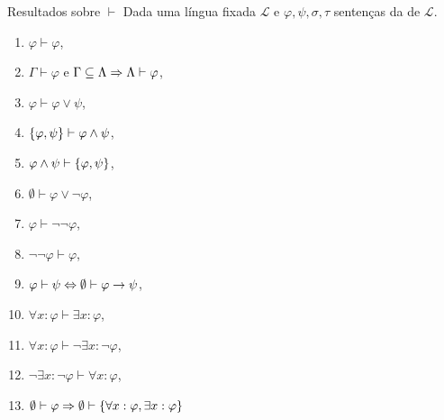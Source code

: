         \begin{proposition}{Resultados sobre $\vdash$}
            Dada uma língua fixada $\mathcal{L}$ e 
            $\varphi,\psi,\sigma,\tau$ sentenças da
            de $\mathcal{L}$.
            \label{vdash_results_00}
            \begin{enumerate}[label=\alph*)]
                \item $    {\varphi}\vdash\varphi$,
                \item $\Gamma\vdash\varphi$ e $\Gamma\subseteq\Lambda\Rightarrow \Lambda\vdash\varphi$,
                \item $    {\varphi}\vdash\varphi\lor\psi$,
                \item $\SET{\varphi}{\psi}\vdash\varphi\land\psi$,
                \item $    {\varphi\land\psi}\vdash\SET{\varphi}{\psi}$,
                \item $\emptyset\vdash  \varphi\lor\neg\varphi$,
                \item $\varphi\vdash\neg\neg\varphi$,
                \item $\neg\neg\varphi\vdash\varphi$,
                \item $    {\varphi}\vdash\psi\Leftrightarrow\emptyset\vdash\varphi\rightarrow\psi$,
                \item $    {\forall x:\varphi}\vdash\exists x:\varphi$,
                \item $    {\forall x:\varphi}\vdash\neg\exists x:\neg\varphi$,
                \item $    {\neg\exists x:\neg\varphi}\vdash\forall x:\varphi$,
                \item $\emptyset\vdash\varphi\RAR\emptyset\vdash\SET{\forall x:\varphi}{\exists x:\varphi}$
            \end{enumerate}
        \end{proposition}

